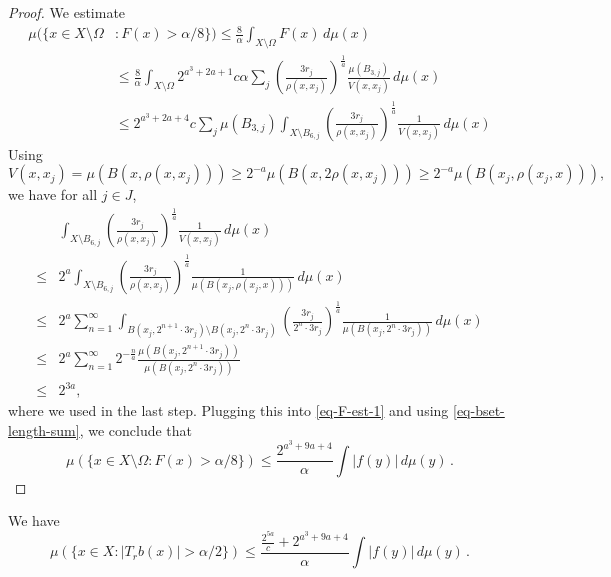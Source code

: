 \begin{proof}
    \leanok
    We estimate
    \begin{align}
        \mu(\{x\in X\setminus\Omega&: F(x)> \alpha/8\})
        \le \frac{8}{\alpha} \int_{X\setminus \Omega} F(x)\,d\mu(x) \\
        &\le \frac{8}{\alpha} \int_{X\setminus \Omega} 2^{a^3+2a+1} c\alpha \sum_{j} \left(\frac{3r_j}{\rho(x,x_j)}\right)^{\frac{1}{a}}\frac{\mu(B_{3,j})}{V(x,x_j)}\,d\mu(x) \\
        \label{eq-F-est-1}
        &\le 2^{a^3+2a+4} c \sum_{j} \mu(B_{3,j}) \int_{X\setminus B_{6,j}} \left(\frac{3r_j}{\rho(x,x_j)}\right)^{\frac{1}{a}}\frac{1}{V(x,x_j)}\,d\mu(x)
    \end{align}
    Using
    \begin{equation*}
        V(x,x_j) = \mu(B(x,\rho(x,x_j))) \ge 2^{-a}\mu(B(x,2\rho(x,x_j))) \ge 2^{-a} \mu(B(x_j,\rho(x_j,x))),
    \end{equation*}
    we have for all $j\in J$,
    \begin{align*}
        &\int_{X\setminus B_{6,j}} \left(\frac{3r_j}{\rho(x,x_j)}\right)^{\frac{1}{a}}\frac{1}{V(x,x_j)}\,d\mu(x) \\
        \le& 2^a \int_{X\setminus B_{6,j}} \left(\frac{3r_j}{\rho(x,x_j)}\right)^{\frac{1}{a}}\frac{1}{\mu(B(x_j,\rho(x_j,x)))}\,d\mu(x) \\
        \le&2^a \sum_{n=1}^\infty \int_{B(x_j,2^{n+1}\cdot3r_j)\setminus B(x_j,2^n\cdot3r_j)} \left(\frac{3r_j}{2^n \cdot3r_j}\right)^{\frac{1}{a}}\frac{1}{\mu(B(x_j,2^n \cdot3r_j))}\,d\mu(x) \\
        \le&2^a \sum_{n=1}^\infty 2^{-\frac{n}{a}} \frac{\mu(B(x_j,2^{n+1}\cdot3r_j))}{\mu(B(x_j,2^n \cdot3r_j))} \\
        \le&2^{3a},
    \end{align*}
    where we used  in the last step.
    Plugging this into \eqref{eq-F-est-1} and using \eqref{eq-bset-length-sum}, we conclude that
    \begin{equation*}
        \mu(\{x\in X\setminus\Omega: F(x)> \alpha/8\}) \le \frac{2^{a^3+9a+4}}{\alpha} \int |f(y)|\,d\mu(y)\,.
    \end{equation*}
\end{proof}


\begin{lemma}
    \label{estimate-bad}
    \leanok
    We have
    \begin{equation*}
        \mu\left({\{x\in X: |T_r b(x)|>\alpha/2\}}\right) \le  \frac{\frac{2^{5a}}{c} + 2^{a^3+9a+4}}{\alpha} \int |f(y)|\,d\mu(y) \,.
    \end{equation*}
\end{lemma}


